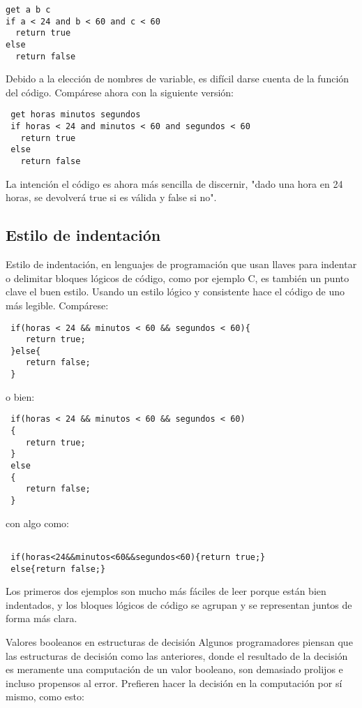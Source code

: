 \documentclass[11pt]{article}
\begin{document}
\begin{verbatim}
get a b c
if a < 24 and b < 60 and c < 60
  return true
else
  return false
\end{verbatim}

Debido a la elección de nombres de variable, es difícil darse cuenta
de la función del código. Compárese ahora con la siguiente versión:

\begin{verbatim}
 get horas minutos segundos 
 if horas < 24 and minutos < 60 and segundos < 60
   return true
 else
   return false
\end{verbatim}

La intención el código es ahora más sencilla de discernir, "dado una
hora en 24 horas, se devolverá true si es válida y false si no".

\subsection*{Estilo de indentación}
\label{sec:org766c5dc}

Estilo de indentación, en lenguajes de programación que usan llaves
para indentar o delimitar bloques lógicos de código, como por
ejemplo C, es también un punto clave el buen estilo. Usando un
estilo lógico y consistente hace el código de uno más
legible. Compárese:


\begin{verbatim}
 if(horas < 24 && minutos < 60 && segundos < 60){
    return true;
 }else{
    return false;
 }
\end{verbatim}
o bien:
\begin{verbatim}
 if(horas < 24 && minutos < 60 && segundos < 60)
 {
    return true;
 }
 else
 {
    return false;
 }
\end{verbatim}

con algo como:

\begin{verbatim}

 if(horas<24&&minutos<60&&segundos<60){return true;}
 else{return false;}
\end{verbatim}

Los primeros dos ejemplos son mucho más fáciles de leer porque están
bien indentados, y los bloques lógicos de código se agrupan y se
representan juntos de forma más clara.

Valores booleanos en estructuras de decisión Algunos programadores
piensan que las estructuras de decisión como las anteriores, donde el
resultado de la decisión es meramente una computación de un valor
booleano, son demasiado prolijos e incluso propensos al
error. Prefieren hacer la decisión en la computación por sí mismo,
como esto:
\end{document}
